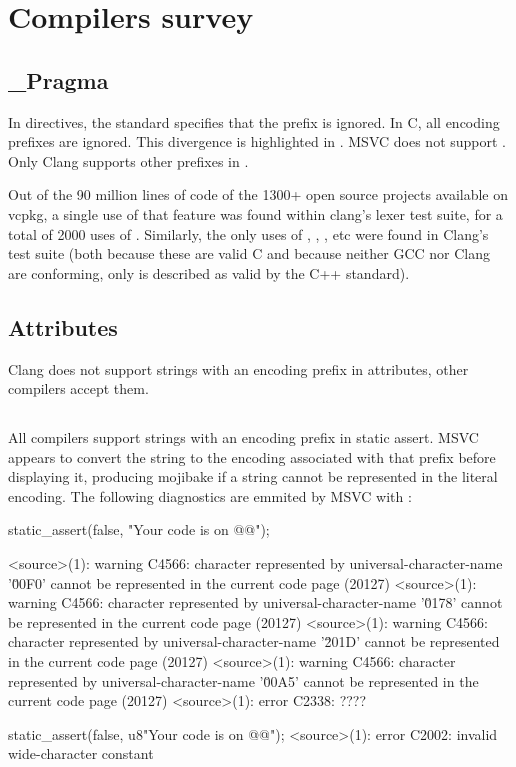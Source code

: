 \documentclass{wg21}
\begin{document}
\section{Compilers survey}

\subsection{_Pragma}

In  directives, the standard specifies that the  prefix is ignored.
In C, all encoding prefixes are ignored. This divergence is highlighted in .
MSVC does not support .  Only Clang supports other prefixes in .

Out of the 90 million lines of code of the 1300+ open source projects available on vcpkg, a
single use of that feature was found within clang’s lexer test suite, for a total of 2000 uses
of . Similarly, the only uses of , , , etc were
found in Clang’s test suite (both because these are valid C and because neither GCC nor Clang
are conforming, only  is described as valid by the C++ standard).

\subsection{Attributes}

Clang does not support strings with an encoding prefix in attributes, other compilers accept them.


\subsection{}

All compilers support strings with an encoding prefix in static assert.
MSVC appears to convert the string to the encoding associated with that prefix before displaying it, producing mojibake if a string
cannot be represented in the literal encoding.
The following diagnostics are emmited by MSVC with :
\begin{quoteblock}
\begin{codeblock}
static_assert(false, "Your code is on @@");

<source>(1): warning C4566: character represented by universal-character-name 
'\u00F0'  cannot be represented in the current code page (20127)
<source>(1): warning C4566: character represented by universal-character-name 
'\u0178'  cannot be represented in the current code page (20127)
<source>(1): warning C4566: character represented by universal-character-name 
'\u201D' cannot be represented in the current code page (20127)
<source>(1): warning C4566: character represented by universal-character-name
'\u00A5' cannot be represented in the current code page (20127)
<source>(1): error C2338: ????

static_assert(false, u8"Your code is on @@");
<source>(1): error C2002: invalid wide-character constant
\end{codeblock}
\end{quoteblock}
\end{document}
